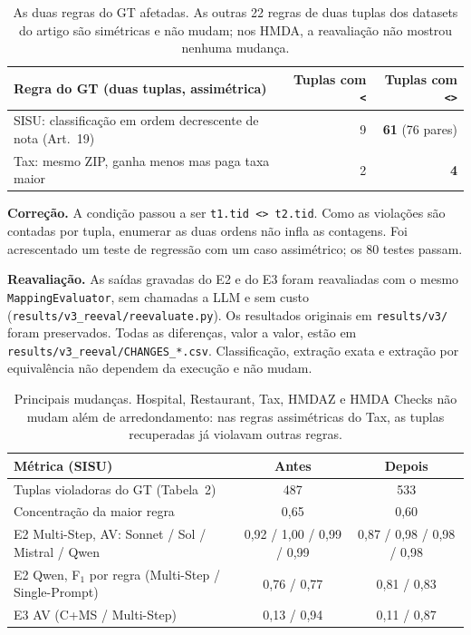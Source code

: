 \documentclass[11pt,a4paper]{article}
\begin{document}
\begin{table}[H]
\centering\small
\begin{tabular}{lrr}
\toprule
Regra do GT (duas tuplas, assimétrica) & Tuplas com \texttt{<} & Tuplas com \texttt{<>}\\
\midrule
SISU: classificação em ordem decrescente de nota (Art.~19) & 9 & \textbf{61} (76 pares)\\
Tax: mesmo ZIP, ganha menos mas paga taxa maior & 2 & \textbf{4}\\
\bottomrule
\end{tabular}
\caption{As duas regras do GT afetadas. As outras 22 regras de duas tuplas dos datasets do artigo são simétricas e
não mudam; nos HMDA, a reavaliação não mostrou nenhuma mudança.}
\end{table}

\noindent\textbf{Correção.} A condição passou a ser \texttt{t1.tid <> t2.tid}. Como as violações são contadas por
tupla, enumerar as duas ordens não infla as contagens. Foi acrescentado um teste de regressão com um caso
assimétrico; os 80 testes passam.

\noindent\textbf{Reavaliação.} As saídas gravadas do E2 e do E3 foram reavaliadas com o mesmo
\texttt{MappingEvaluator}, sem chamadas a LLM e sem custo (\texttt{results/v3\_reeval/reevaluate.py}). Os
resultados originais em \texttt{results/v3/} foram preservados. Todas as diferenças, valor a valor, estão em
\texttt{results/v3\_reeval/CHANGES\_*.csv}. Classificação, extração exata e extração por equivalência não dependem
da execução e não mudam.

\begin{table}[H]
\centering\small
\begin{tabular}{lcc}
\toprule
Métrica (SISU) & Antes & Depois\\
\midrule
Tuplas violadoras do GT (Tabela~2) & 487 & 533\\
Concentração da maior regra & 0,65 & 0,60\\
E2 Multi-Step, AV: Sonnet / Sol / Mistral / Qwen & 0,92 / 1,00 / 0,99 / 0,99 & 0,87 / 0,98 / 0,98 / 0,98\\
E2 Qwen, F$_1$ por regra (Multi-Step / Single-Prompt) & 0,76 / 0,77 & 0,81 / 0,83\\
E3 AV (C+MS / Multi-Step) & 0,13 / 0,94 & 0,11 / 0,87\\
\bottomrule
\end{tabular}
\caption{Principais mudanças. Hospital, Restaurant, Tax, HMDAZ e HMDA Checks não mudam além de arredondamento:
nas regras assimétricas do Tax, as tuplas recuperadas já violavam outras regras.}
\end{table}
\end{document}
